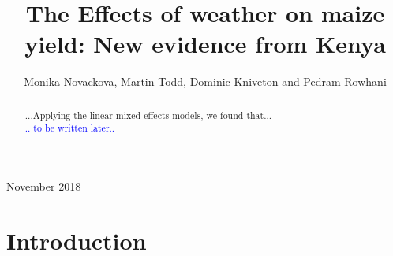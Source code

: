 \documentclass[12pt]{iopart}
\begin{document}
\submitto{\ERL}

\title{The Effects of weather on maize yield: New evidence from Kenya}

\author{Monika Novackova, Martin Todd, Dominic Kniveton and Pedram Rowhani}

\address{Department of Geography, University of Sussex, Falmer, UK}
\vspace{10pt}
\begin{indented}
\item[]November 2018
\end{indented}

\doublespacing
\begin{abstract}
...Applying the linear mixed effects models, we found that...\\
\textcolor{blue}{.. to be written later..}
\end{abstract}

%
%
%
% 
%
\maketitle
\section{Introduction}\label{Introduction}
\end{document}
